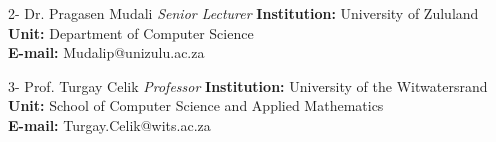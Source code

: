 \documentclass[letterpaper]{moderncv}        %
\begin{document}
\cventry
{2-}
{Dr. Pragasen Mudali}
{}
{\textit{Senior Lecturer}}
{}
{\textbf{Institution:} University of Zululand\\
	\textbf{Unit:} Department of Computer Science\\
	\textbf{E-mail:} Mudalip@unizulu.ac.za}
\vspace{1mm}

\cventry
{3-}
{Prof. Turgay Celik}
{}
{\textit{Professor}}
{}
{\textbf{Institution:} University of the Witwatersrand\\
	\textbf{Unit:} School of Computer Science and Applied Mathematics\\
	\textbf{E-mail:} Turgay.Celik@wits.ac.za}
\vspace{1mm}
\end{document}
